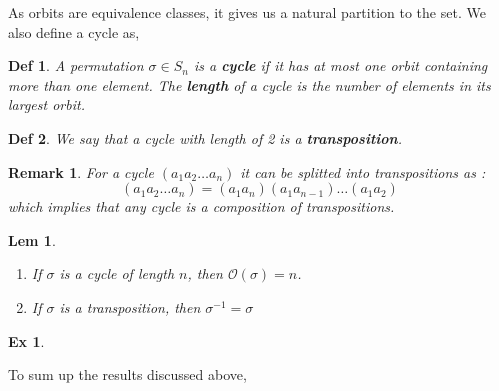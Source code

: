 \documentclass[paper=a4, fontsize=11pt]{scrartcl}
\newcommand{\nextline}{$ $ \newline \vspace{-0.15in}}
\newtheorem{definition}{Def}
\newtheorem{example}{Ex}
\newtheorem{lemma}{Lem}
\newtheorem*{remark}{Remark}
\begin{document}
As orbits are equivalence classes, it gives us a natural partition to the set. We also define a cycle as, \\

\begin{definition}
	A permutation $\sigma\in S_n$ is a \textbf{cycle} if it has at most one orbit containing more than one element. The \textbf{length} of a cycle is the number of elements in its largest orbit.\\
\end{definition}

\begin{definition}
	We say that a cycle with length of 2 is a \textbf{transposition}.\\
\end{definition}

\begin{remark}
	For a cycle $(a_1 a_2 \dots a_n)$ it can be splitted into transpositions as :
	\begin{equation}\nonumber
		(a_1 a_2 \dots a_n) = (a_1 a_n) (a_1 a_{n-1}) \dots (a_1 a_2)
	\end{equation}
	which implies that any cycle is a composition of transpositions.\\
\end{remark}

\begin{lemma}
	\nextline
	\begin{enumerate}[label=\arabic*)]
		\item If $\sigma$ is a cycle of length $n$, then $\mathcal{O}(\sigma) = n$.
		\item If $\sigma$ is a transposition, then $\sigma^{-1}=\sigma$\\
	\end{enumerate}
\end{lemma}

\begin{example}
\nextline
{}
\end{example}

To sum up the results discussed above, \\
\end{document}
